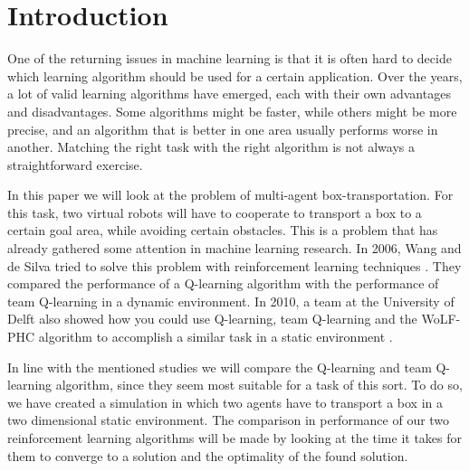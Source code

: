 \section{Introduction}
One of the returning issues in machine learning is that it is often hard to decide which learning algorithm should be used for a certain application. Over the years, a lot of valid learning algorithms have emerged, each with their own advantages and disadvantages. Some algorithms might be faster, while others might be more precise, and an algorithm that is better in one area usually performs worse in another. Matching the right task with the right algorithm is not always a straightforward exercise.

In this paper we will look at the problem of multi-agent box-transportation.  For this task, two virtual robots will have to cooperate to transport a box to a certain goal area, while avoiding certain obstacles. This is a problem that has already gathered some attention in machine learning research. In 2006, Wang and de Silva tried to solve this problem with reinforcement learning techniques \cite{wang2006}. They compared the performance of a Q-learning algorithm with the performance of team Q-learning in a dynamic environment. In 2010, a team at the University of Delft also showed how you could use Q-learning, team Q-learning and the WoLF-PHC algorithm to accomplish a similar task in a static environment \cite{busoniu2010}.

In line with the mentioned studies we will compare the Q-learning and team Q-learning algorithm, since they seem most suitable for a task of this sort. To do so, we have created a simulation in which two agents have to transport a box in a two dimensional static environment. The comparison in performance of our two reinforcement learning algorithms will be made by looking at the time it takes for them to converge to a solution and the optimality of the found solution. 